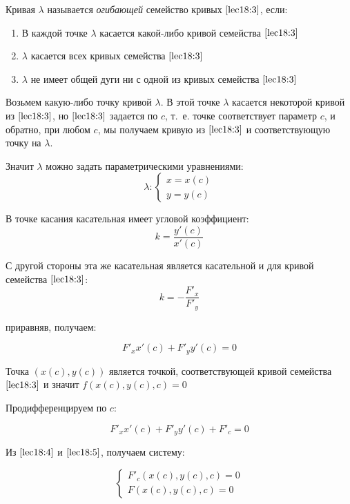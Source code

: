 \documentclass[../../main.tex]{subfiles}
\begin{document}
Кривая $\lambda$ называется \emph{ огибающей} семейство кривых 
$\eqref{lec18:3}$, если:

\begin{enumerate}
	\item В каждой точке $\lambda$ касается какой-либо кривой семейства 
	$\eqref{lec18:3}$
	\item $\lambda$ касается всех кривых семейства $\eqref{lec18:3}$
	\item $\lambda$ не имеет общей дуги ни с одной из кривых семейства 
	$\eqref{lec18:3}$
\end{enumerate}

Возьмем какую-либо точку кривой $\lambda$. В этой точке $\lambda$ касается 
некоторой кривой из $\eqref{lec18:3}$, но $\eqref{lec18:3}$ задается по $c$, 
т.~е. точке соответствует параметр $c$, и обратно, при любом $c$, мы получаем 
кривую из $\eqref{lec18:3}$ и соответствующую точку на $\lambda$.

Значит $\lambda$ можно задать параметрическими уравнениями:
\[ \lambda \colon \begin{cases}
x=x\left( c \right) \\
y=y\left( c \right)  
\end{cases} \]

В точке касания касательная имеет угловой коэффициент:
\[ k = \frac{y' \left( c \right) }{ x' \left( c \right) } \]

С другой стороны эта же касательная является касательной и для кривой 
семейства $\eqref{lec18:3} $:
\[ k = - \frac{F'_x}{ F'_y}\] 

приравняв, получаем:

\begin{equation}\label{lec18:4} F'_x x'\left( c \right) + F'_y y'\left( c 
\right) = 0 \end{equation}

Точка $\left( x \left( c\right), y\left( c\right)  \right) $ является точкой, 
соответствующей кривой семейства $\eqref{lec18:3} $ и значит $f \left( x \left( 
c\right), y\left( c\right), c \right) = 0 $

Продифференцируем по $c$:

\begin{equation}\label{lec18:5} F'_x x'\left( c \right) + F'_y y'\left( c 
\right) + F'_c = 0 \end{equation}

Из $\eqref{lec18:4}$ и $\eqref{lec18:5}$, получаем систему:

\begin{equation}\label{lec18:6} \begin{cases}
F'_c \left( x \left( c\right), y\left( c\right), c \right)  = 0\\
F \left( x \left( c\right), y\left( c\right), c \right)  = 0
\end{cases}  \end{equation}
\end{document}
